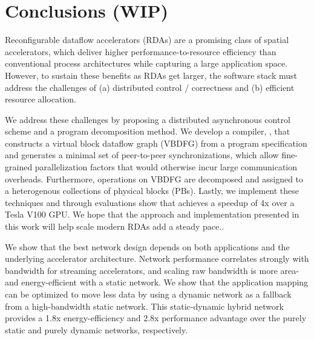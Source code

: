 \chapter{Conclusions (WIP)}

Reconfigurable dataflow accelerators (RDAs) are a promising class of spatial accelerators, which deliver higher performance-to-resource efficiency than conventional process architectures while capturing a large application space.
However, to sustain these benefits as RDAs get larger, the software stack must address the challenges of (a) distributed control / correctness and (b) efficient resource allocation.

We address these challenges by proposing a distributed asynchronous control scheme and a program decomposition method. 
We develop a compiler, \name{}, that constructs a virtual block dataflow graph (VBDFG) from a program specification and generates a minimal set of peer-to-peer synchronizations, which allow fine-grained parallelization factors that would otherwise incur large communication overheads.
Furthermore, operations on VBDFG are decomposed and assigned to a heterogenous collections of physical blocks (PBs). 
Lastly, we implement these techniques and through evaluations show that \name{} achieves a speedup of 4x over a Tesla V100 GPU.
We hope that the approach and implementation presented in this work will help scale modern RDAs add a steady pace..

We show that the best network design depends on both applications and the underlying accelerator architecture.
Network performance correlates strongly with bandwidth for streaming accelerators, and scaling raw bandwidth is more area- and energy-efficient with a static network.
We show that the application mapping can be optimized to move less data by using a dynamic network as a fallback from a high-bandwidth static network.
This static-dynamic hybrid network provides a 1.8x energy-efficiency and
2.8x performance advantage over the purely static and purely dynamic networks, respectively.


